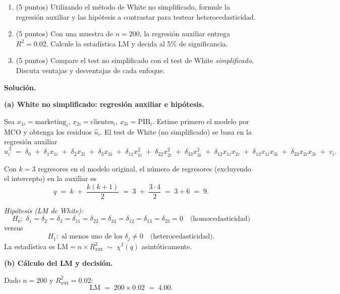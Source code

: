 \documentclass[10pt,a4paper]{article}
\begin{document}
\begin{enumerate}
\begin{enumerate}
\item (5 puntos) Utilizando el método de White no simplificado, formule la {regresión auxiliar} y las {hipótesis} a contrastar para testear heterocedasticidad.

\item (5 puntos) Con una muestra de \(n=200\), la regresión auxiliar entrega \(R^2 = 0{.}02\).
Calcule la estadística LM y decida al 5\% de significancia.

\item (5 puntos) Compare el test no simplificado con el test de White \emph{simplificado}. Discuta ventajas y desventajas de cada enfoque.
\end{enumerate}


\textbf{Solución.}

\textbf{(a) White no simplificado: regresión auxiliar e hipótesis.}

Sea \(x_{1i}=\text{marketing}_i\), \(x_{2i}=\text{clientes}_i\), \(x_{3i}=\text{PIB}_i\).
Estime primero el modelo por MCO y obtenga los residuos \(\hat u_i\).
El test de White (no simplificado) se basa en la regresión auxiliar
\[
\hat u_i^{\,2} \;=\; \delta_0 \;+\; \delta_1 x_{1i} \;+\; \delta_2 x_{2i} \;+\; \delta_3 x_{3i}
\;+\; \delta_{11} x_{1i}^2 \;+\; \delta_{22} x_{2i}^2 \;+\; \delta_{33} x_{3i}^2
\;+\; \delta_{12} x_{1i}x_{2i} \;+\; \delta_{13} x_{1i}x_{3i} \;+\; \delta_{23} x_{2i}x_{3i} \;+\; v_i.
\]

Con \(k=3\) regresores en el modelo original, el número de regresores (excluyendo el intercepto) en la auxiliar es
\[
q \;=\; k \;+\; \frac{k(k+1)}{2}
\;=\; 3 \;+\; \frac{3\cdot 4}{2}
\;=\; 3 + 6 \;=\; 9.
\]

\noindent\emph{Hipótesis (LM de White):}
\[
H_0:\; \delta_1=\delta_2=\delta_3=\delta_{11}=\delta_{22}=\delta_{33}=\delta_{12}=\delta_{13}=\delta_{23}=0
\quad\text{(homocedasticidad)}
\]
versus
\[
H_1:\; \text{al menos uno de los } \delta_j \neq 0
\quad\text{(heterocedasticidad)}.
\]
La estadística es \(\text{LM} = n \times R^2_{\text{aux}} \;\sim\; \chi^2(q)\) asintóticamente.

\medskip
\textbf{(b) Cálculo del LM y decisión.}

Dado \(n=200\) y \(R^2_{\text{aux}}=0{.}02\):
\[
\text{LM} \;=\; 200 \times 0{.}02 \;=\; 4{.}00.
\]


\end{enumerate}
\end{document}
